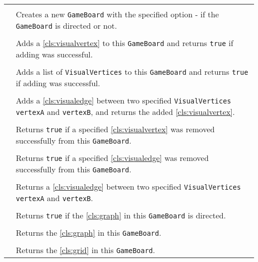 \paragraph*{}
\begin{longtable}{Lp{10cm}}
	\startmethodtable
	 \\
	& Creates a new \texttt{GameBoard} with the specified option - if the \texttt{GameBoard} is directed or not. \\
	 \\
	& Adds a \ref{cls:visualvertex} to this \texttt{GameBoard} and returns \texttt{true} if adding was successful. \\
	 \\
	& Adds a list of \texttt{VisualVertices} to this \texttt{GameBoard} and returns \texttt{true} if adding was successful. \\
	 \\
	& Adds a \ref{cls:visualedge} between two specified \texttt{VisualVertices} \texttt{vertexA} and \texttt{vertexB}, and returns the added \ref{cls:visualvertex}. \\
	 \\
	& Returns \texttt{true} if a specified \ref{cls:visualvertex} was removed successfully from this \texttt{GameBoard}. \\
	 \\
	& Returns \texttt{true} if a specified \ref{cls:visualedge} was removed successfully from this \texttt{GameBoard}. \\
	 \\
	& Returns a \ref{cls:visualedge} between two specified \texttt{VisualVertices} \texttt{vertexA} and \texttt{vertexB}. \\
	 \\
	& Returns \texttt{true} if the \ref{cls:graph} in this \texttt{GameBoard} is directed. \\
	 \\
	& Returns the \ref{cls:graph} in this \texttt{GameBoard}. \\
	 \\
	& Returns the \ref{cls:grid} in this \texttt{GameBoard}. \\
	\hline
\end{longtable}

